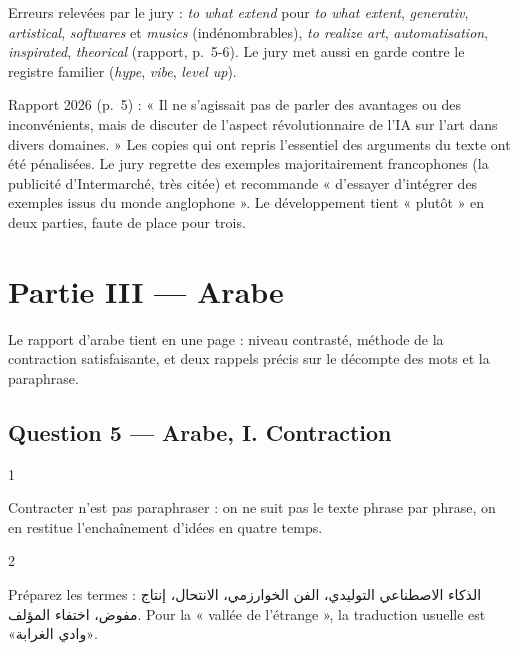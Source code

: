 \documentclass[11pt,a4paper]{article}
\begin{document}
\begin{piege}

Erreurs relevées par le jury : \emph{to what extend} pour \emph{to what extent}, \emph{generativ}, \emph{artistical}, \emph{softwares} et \emph{musics} (indénombrables), \emph{to realize art}, \emph{automatisation}, \emph{inspirated}, \emph{theorical} (rapport, p.~5-6). Le jury met aussi en garde contre le registre familier (\emph{hype}, \emph{vibe}, \emph{level up}).

\end{piege}

\begin{jury}

Rapport 2026 (p.~5) : « Il ne s'agissait pas de parler des avantages ou des inconvénients, mais de discuter de l'aspect révolutionnaire de l'IA sur l'art dans divers domaines. » Les copies qui ont repris l'essentiel des arguments du texte ont été pénalisées. Le jury regrette des exemples majoritairement francophones (la publicité d'Intermarché, très citée) et recommande « d'essayer d'intégrer des exemples issus du monde anglophone ». Le développement tient « plutôt » en deux parties, faute de place pour trois.

\end{jury}

\hypertarget{partie-iii-arabe}{%
\section{Partie III --- Arabe}\label{partie-iii-arabe}}

Le rapport d'arabe tient en une page : niveau contrasté, méthode de la contraction satisfaisante, et deux rappels précis sur le décompte des mots et la paraphrase.

\hypertarget{question-5-arabe-i.-contraction}{%
\subsection{Question 5 --- Arabe, I. Contraction}\label{question-5-arabe-i.-contraction}}

\begin{indication}{1}

Contracter n'est pas paraphraser : on ne suit pas le texte phrase par phrase, on en restitue l'enchaînement d'idées en quatre temps.

\end{indication}

\begin{indication}{2}

Préparez les termes : الذكاء الاصطناعي التوليدي، الفن الخوارزمي، الانتحال، إنتاج مفوض، اختفاء المؤلف. Pour la « vallée de l'étrange », la traduction usuelle est «وادي الغرابة».

\end{indication}
\end{document}
